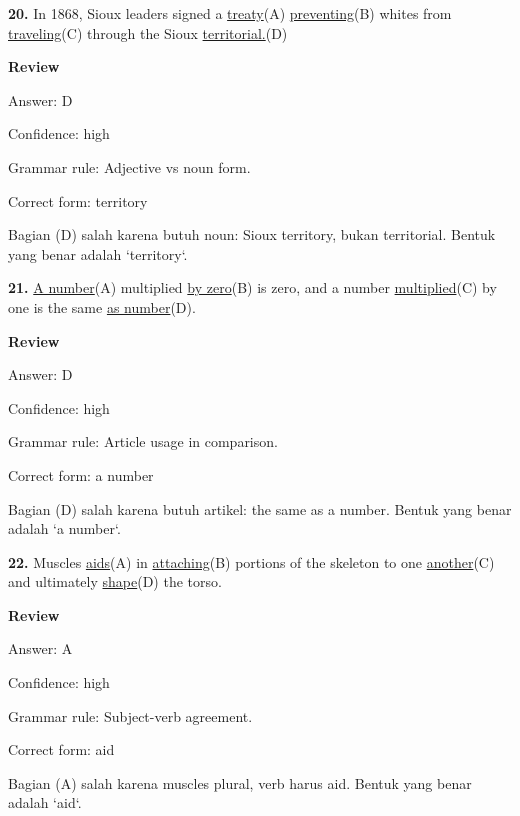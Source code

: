\documentclass[12pt]{article}
\begin{document}
\endgroup
\par
\vspace{\questionblockgap}
\noindent\textbf{20.} In 1868, Sioux leaders signed a \uline{treaty}(A) \uline{preventing}(B) whites from \uline{traveling}(C) through the Sioux \uline{territorial.}(D)
\par
\begingroup
\setlength{\parskip}{0pt}
\setlength{\parindent}{0pt}
\textbf{Review}\par
Answer: D\par
Confidence: high\par
Grammar rule: Adjective vs noun form.\par
Correct form: territory\par
Bagian (D) salah karena butuh noun: Sioux territory, bukan territorial. Bentuk yang benar adalah `territory`.\par
\endgroup
\par
\vspace{\questionblockgap}
\noindent\textbf{21.} \uline{A number}(A) multiplied \uline{by zero}(B) is zero, and a number \uline{multiplied}(C) by one is the same \uline{as number}(D).
\par
\begingroup
\setlength{\parskip}{0pt}
\setlength{\parindent}{0pt}
\textbf{Review}\par
Answer: D\par
Confidence: high\par
Grammar rule: Article usage in comparison.\par
Correct form: a number\par
Bagian (D) salah karena butuh artikel: the same as a number. Bentuk yang benar adalah `a number`.\par
\endgroup
\par
\vspace{\questionblockgap}
\noindent\textbf{22.} Muscles \uline{aids}(A) in \uline{attaching}(B) portions of the skeleton to one \uline{another}(C) and ultimately \uline{shape}(D) the torso.
\par
\begingroup
\setlength{\parskip}{0pt}
\setlength{\parindent}{0pt}
\textbf{Review}\par
Answer: A\par
Confidence: high\par
Grammar rule: Subject-verb agreement.\par
Correct form: aid\par
Bagian (A) salah karena muscles plural, verb harus aid. Bentuk yang benar adalah `aid`.\par
\endgroup
\end{document}
